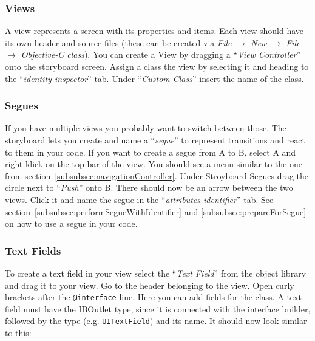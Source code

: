 


\subsubsection{Views}
\label{subsubsec:views}
A view represents a screen with its properties and items. Each view should have its own header and source files (these can be created via \textit{File $\rightarrow$ New $\rightarrow$ File $\rightarrow$ Objective-C class}). You can create a View by dragging a ``\textit{View Controller}'' onto the storyboard screen. Assign a class the view by selecting it and heading to the ``\textit{identity inspector}'' tab. Under ``\textit{Custom Class}'' insert the name of the class.

\subsubsection{Segues}
\label{subsubsec:segues}
If you have multiple views you probably want to switch between those. The storyboard lets you create and name a ``\textit{segue}'' to represent transitions and react to them in your code. If you want to create a segue from A to B, select A and right klick on the top bar of the view. You should see a menu similar to the one from section~\ref{subsubsec:navigationController}. Under Stroyboard Segues drag the circle next to ``\textit{Push}'' onto B. There should now be an arrow between the two views. Click it and name the segue in the ``\textit{attributes identifier}'' tab. See section~\ref{subsubsec:performSegueWithIdentifier} and \ref{subsubsec:prepareForSegue} on how to use a segue in your code.

\subsubsection{Text Fields}
\label{subsubsec:textfields}
To create a text field in your view select the ``\textit{Text Field}'' from the object library and drag it to your view. Go to the header belonging to the view. Open curly brackets after the \lstinline^@interface^ line. Here you can add fields for the class. A text field must have the IBOutlet type, since it is connected  with the interface builder, followed by the type (e.g. \lstinline^UITextField^) and its name. It should now look similar to this:

